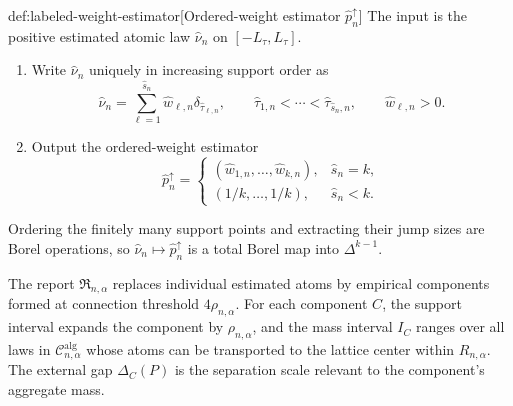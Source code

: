 \documentclass[11pt]{article}
\begin{document}
\begin{algorithmv}{def:labeled-weight-estimator}[Ordered-weight estimator \(\widehat p_n^{\uparrow}\)]
The input is the positive estimated atomic law \(\widehat\nu_n\) on \([-L_\tau,L_\tau]\).

\begin{enumerate}
\item Write \(\widehat\nu_n\) uniquely in increasing support order as
\[
\widehat\nu_n
=
\sum_{\ell=1}^{\widehat s_n}
\widehat w_{\ell,n}\delta_{\widehat\tau_{\ell,n}},
\qquad
\widehat\tau_{1,n}<\cdots<\widehat\tau_{\widehat s_n,n},
\qquad
\widehat w_{\ell,n}>0 .
\]

\item Output the ordered-weight estimator
\[
\widehat p_n^{\uparrow}
=
\begin{cases}
(\widehat w_{1,n},\ldots,\widehat w_{k,n}), & \widehat s_n=k,\\[2mm]
(1/k,\ldots,1/k), & \widehat s_n<k .
\end{cases}
\]
\end{enumerate}

Ordering the finitely many support points and extracting their jump sizes are Borel operations, so \(\widehat\nu_n\mapsto\widehat p_n^{\uparrow}\) is a total Borel map into \(\Delta^{k-1}\).
\end{algorithmv}

The report \(\mathfrak R_{n,\alpha}\) replaces individual estimated atoms by empirical components formed at connection threshold \(4\rho_{n,\alpha}\). For each component \(C\), the support interval expands the component by \(\rho_{n,\alpha}\), and the mass interval \(I_C\) ranges over all laws in \(\mathcal C^{\mathrm{alg}}_{n,\alpha}\) whose atoms can be transported to the lattice center within \(R_{n,\alpha}\). The external gap \(\Delta_C(P)\) is the separation scale relevant to the component's aggregate mass.
\end{document}
